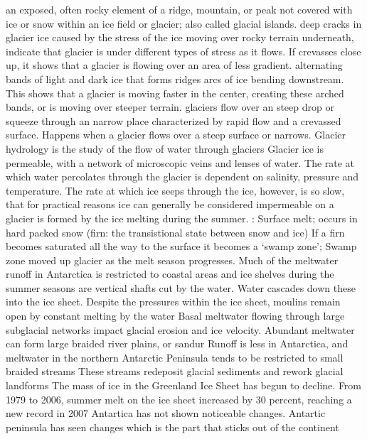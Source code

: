 		 an exposed, often rocky element of a ridge, mountain, or peak not covered with ice or snow within an ice field or glacier; also called glacial islands.
		 deep cracks in glacier ice caused by the stress of the ice moving over rocky terrain underneath, indicate that glacier is under different types of stress as it flows. If crevasses close up, it shows that a glacier is flowing over an area of less gradient. 
		 alternating bands of light and dark ice that forms ridges arcs of ice bending downstream. This shows that a glacier is moving faster in the center, creating these arched bands, or is moving over steeper terrain.
		 glaciers flow over an steep drop or squeeze through an narrow place characterized by rapid flow and a crevassed surface. Happens when a glacier flows over a steep surface or narrows.
		\ddd Glacier hydrology is the study of the flow of water through glaciers
		\ddd Glacier ice is permeable, with a network of microscopic veins and lenses of water.
			\ddd The rate at which water percolates through the glacier is dependent on salinity, pressure and temperature. 
			\ddd  The rate at which ice seeps through the ice, however, is so slow, that for practical reasons ice can generally be considered impermeable
		 on a glacier is formed by the ice melting during the summer.
		: Surface melt; occurs in hard packed snow (firn: the transistional state between snow and ice)
		 If a firn becomes saturated all the way to the surface it becomes a ‘swamp zone’; Swamp zone moved up glacier as the melt season progresses.
		\ddd Much of the meltwater runoff in Antarctica is restricted to coastal areas and ice shelves during the summer seasons
			\ddd {} are vertical shafts cut by the water.
			\ddd Water cascades down these into the ice sheet. Despite the pressures within the ice sheet, moulins remain open by constant melting by the water
			\ddd Basal meltwater flowing through large subglacial networks impact glacial erosion and ice velocity. 
			\ddd Abundant meltwater can form large braided river plains, or sandur
			\ddd Runoff is less in Antarctica, and meltwater in the northern Antarctic Peninsula tends to be restricted to small braided streams
			\ddd These streams redeposit glacial sediments and rework glacial landforms
		\ddd The mass of ice in the Greenland Ice Sheet has begun to decline. From 1979 to 2006, summer melt on the ice sheet increased by 30 percent, reaching a new record in 2007
		\ddd Antartica has not shown noticeable changes. 
		\ddd Antartic peninsula has seen changes which is the part that sticks out of the continent
	